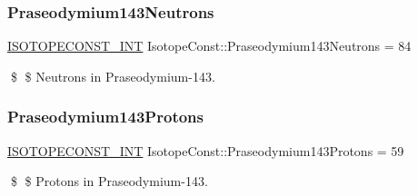 \subsubsection{\texorpdfstring{Praseodymium143\+Neutrons}{Praseodymium143Neutrons}}
{\footnotesize\ttfamily \mbox{\hyperlink{group___isotope_const-_macros_ga5f18360b3e99483a35c32d789e62621c}{I\+S\+O\+T\+O\+P\+E\+C\+O\+N\+S\+T\+\_\+\+I\+NT}} Isotope\+Const\+::\+Praseodymium143\+Neutrons = 84}

\$ \$ Neutrons in Praseodymium-\/143. \mbox{\label{group___isotope_const-_praseodymium-_pr143_ga407ceeeb85fabc3b2f85cd2045eda0c6}} 
\subsubsection{\texorpdfstring{Praseodymium143\+Protons}{Praseodymium143Protons}}
{\footnotesize\ttfamily \mbox{\hyperlink{group___isotope_const-_macros_ga5f18360b3e99483a35c32d789e62621c}{I\+S\+O\+T\+O\+P\+E\+C\+O\+N\+S\+T\+\_\+\+I\+NT}} Isotope\+Const\+::\+Praseodymium143\+Protons = 59}

\$ \$ Protons in Praseodymium-\/143. 